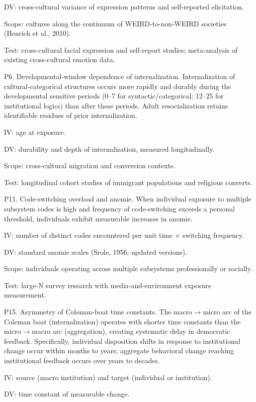 \documentclass[12pt,a4paper]{article}
\begin{document}
DV: cross-cultural variance of expression patterns and self-reported elicitation.

Scope: cultures along the continuum of WEIRD-to-non-WEIRD societies (Henrich et al., 2010).

Test: cross-cultural facial expression and self-report studies; meta-analysis of existing cross-cultural emotion data.


P6. Developmental-window dependence of internalization. Internalization of cultural-categorical structures occurs more rapidly and durably during the developmental sensitive periods (0--7 for syntactic/categorical; 12--25 for institutional logics) than after these periods. Adult resocialization retains identifiable residues of prior internalization.


IV: age at exposure.

DV: durability and depth of internalization, measured longitudinally.

Scope: cross-cultural migration and conversion contexts.

Test: longitudinal cohort studies of immigrant populations and religious converts.


P11. Code-switching overload and anomie. When individual exposure to multiple subsystem codes is high and frequency of code-switching exceeds a personal threshold, individuals exhibit measurable increases in anomie.


IV: number of distinct codes encountered per unit time × switching frequency.

DV: standard anomie scales (Srole, 1956; updated versions).

Scope: individuals operating across multiple subsystems professionally or socially.

Test: large-N survey research with media-and-environment exposure measurement.


P15. Asymmetry of Coleman-boat time constants. The macro$\rightarrow$micro arc of the Coleman boat (internalization) operates with shorter time constants than the micro$\rightarrow$macro arc (aggregation), creating systematic delay in democratic feedback. Specifically, individual disposition shifts in response to institutional change occur within months to years; aggregate behavioral change reaching institutional feedback occurs over years to decades.


IV: source (macro institution) and target (individual or institution).

DV: time constant of measurable change.
\end{document}
